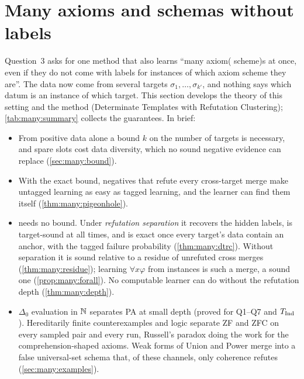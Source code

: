 \providecommand{\manyTr}{\mathrm{Tr}}
\providecommand{\manyVS}{\mathrm{VS}}
\providecommand{\manyCov}{\mathrm{Cov}}
\providecommand{\manyS}{\mathcal{S}}
\providecommand{\manyFail}{\mathrm{Fail}}
\providecommand{\manyRstar}{R^{*}}

\section{Many axioms and schemas without labels}\label{sec:many}

Question~3 asks for one method that also learns ``many axiom( scheme)s at once, even if they do not come with labels for
instances of which axiom scheme they are''. The data now come from several targets $\sigma_1,\dots,\sigma_{k'}$, and
nothing says which datum is an instance of which target. This section develops the theory of this setting and the method
\DTRC{} (Determinate Templates with Refutation Clustering); \cref{tab:many:summary} collects the guarantees. In brief:
\begin{itemize}
\item From positive data alone a bound $k$ on the number of targets is necessary, and spare slots cost data diversity,
  which no sound negative evidence can replace (\cref{sec:many:bound}).
\item With the exact bound, negatives that refute every cross-target merge make untagged learning as easy as tagged
  learning, and the learner can find them itself (\cref{thm:many:pigeonhole}).
\item \DTRC{} needs no bound. Under \emph{refutation separation} it recovers the hidden labels, is target-sound at all
  times, and is exact once every target's data contain an anchor, with the tagged failure probability
  (\cref{thm:many:dtrc}). Without separation it is sound relative to a residue of unrefuted cross merges
  (\cref{thm:many:residue}); learning $\forall x\varphi$ from instances is such a merge, a sound one
  (\cref{prop:many:forall}). No computable learner can do without the refutation depth (\cref{thm:many:depth}).
\item $\Delta_0$ evaluation in $\mathbb{N}$ separates PA at small depth (proved for Q1--Q7 and $T_{\mathrm{Ind}}$). Hereditarily finite
  counterexamples and logic separate ZF and ZFC on every sampled pair and every run, Russell's paradox doing the work for
  the comprehension-shaped axioms. Weak forms of Union and Power merge into a false universal-set schema that, of these
  channels, only coherence refutes (\cref{sec:many:examples}).
\end{itemize}

